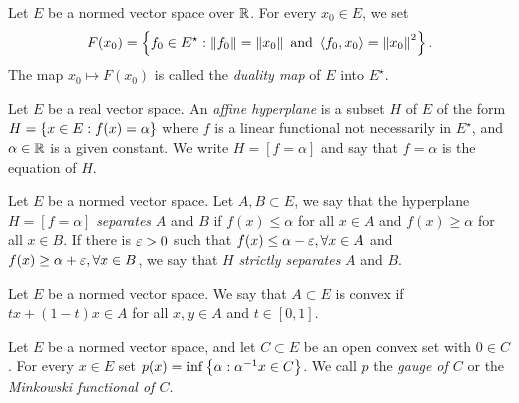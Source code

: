 \documentclass[11pt]{article}
\begin{document}
\begin{definition}
    Let $E$ be a normed vector space over $\mathbb{R}$. For every $x_0\in E$, we set 
    \begin{equation*}
        F(x_0) = \left\{f_0\in E^\star : \left\lVert f_0\right\rVert = \left\lVert x_0\right\rVert \text{ and } \left\langle f_0, x_0\right\rangle = \left\lVert x_0\right\rVert^2\right\}.
    \end{equation*}
    The map $x_0\mapsto F(x_0)$ is called the \textit{duality map} of $E$ into $E^\star$.
\end{definition}

\begin{definition}
    Let $E$ be a real vector space. An \textit{affine hyperplane} is a subset $H$ of $E$ of the form $H= \left\{x\in E : f(x) = \alpha\right\}$ where $f$ is a linear functional not necessarily in $E^\star$, and $\alpha \in \mathbb{R}$ is a given constant.  We write $H=[f=\alpha]$ and say that $f=\alpha$ is the equation of $H$.
\end{definition}

\begin{definition}
    Let $E$ be a normed vector space. Let $A,B\subset E$, we say that the hyperplane $H=[f=\alpha]$ \textit{separates} $A$ and $B$ if $f(x)\leq \alpha$ for all $x\in A$ and $f(x)\geq \alpha$ for all $x\in B$. If there is $\varepsilon>0$ such that $f(x)\leq \alpha-\varepsilon, \forall x\in A$ and $f(x)\geq \alpha+\varepsilon, \forall x\in B$, we say that $H$ \textit{strictly separates} $A$ and $B$.  
\end{definition}

\begin{definition}
    Let $E$ be a normed vector space. We say that $A\subset E$ is convex if $tx +(1-t)x\in A$ for all $x,y\in A$ and $t\in [0,1]$.
\end{definition}

\begin{definition}
    Let $E$ be a normed vector space, and let $C\subset E$ be an open convex set with $0\in C$. For every $x\in E$ set $p(x)= \inf \left\{\alpha : \alpha^{-1}x\in C\right\}$. We call $p$ the \textit{gauge of $C$} or the \textit{Minkowski functional of $C$}.
\end{definition}
\end{document}
